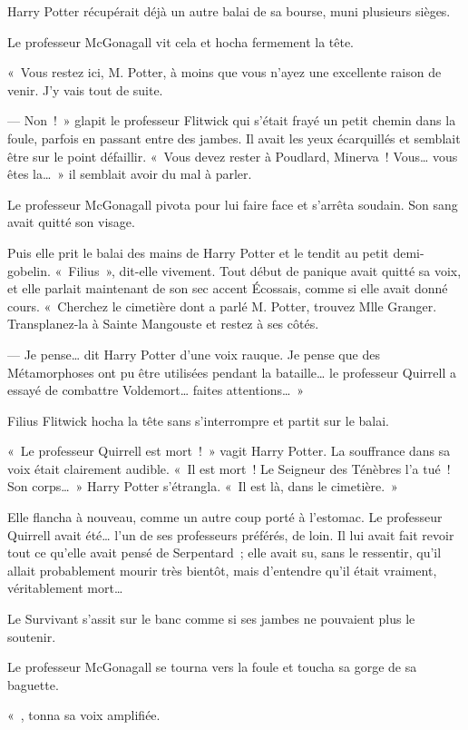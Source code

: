 Harry Potter récupérait déjà un autre balai de sa bourse, muni plusieurs sièges.

Le professeur McGonagall vit cela et hocha fermement la tête.

«~Vous restez ici, M. Potter, à moins que vous n'ayez une excellente raison de venir. J'y vais tout de suite.

--- Non~!~» glapit le professeur Flitwick qui s'était frayé un petit chemin dans la foule, parfois en passant entre des jambes. Il avait les yeux écarquillés et semblait être sur le point défaillir. «~Vous devez rester à Poudlard, Minerva~! Vous… vous êtes la…~» il semblait avoir du mal à parler.

Le professeur McGonagall pivota pour lui faire face et s'arrêta soudain. Son sang avait quitté son visage.

Puis elle prit le balai des mains de Harry Potter et le tendit au petit demi-gobelin. «~Filius~», dit-elle vivement. Tout début de panique avait quitté sa voix, et elle parlait maintenant de son sec accent Écossais, comme si elle avait donné cours. «~Cherchez le cimetière dont a parlé M. Potter, trouvez Mlle Granger. Transplanez-la à Sainte Mangouste et restez à ses côtés.

--- Je pense… dit Harry Potter d'une voix rauque. Je pense que des Métamorphoses ont pu être utilisées pendant la bataille… le professeur Quirrell a essayé de combattre Voldemort… faites attentions…~»

Filius Flitwick hocha la tête sans s'interrompre et partit sur le balai.

«~Le professeur Quirrell est mort~!~» vagit Harry Potter. La souffrance dans sa voix était clairement audible. «~Il est mort~! Le Seigneur des Ténèbres l'a tué~! Son corps…~» Harry Potter s'étrangla. «~Il est là, dans le cimetière.~»

Elle flancha à nouveau, comme un autre coup porté à l'estomac. Le professeur Quirrell avait été… l'un de ses professeurs préférés, de loin. Il lui avait fait revoir tout ce qu'elle avait pensé de Serpentard~; elle avait su, sans le ressentir, qu'il allait probablement mourir très bientôt, mais d'entendre qu'il était vraiment, véritablement mort…

Le Survivant s'assit sur le banc comme si ses jambes ne pouvaient plus le soutenir.

Le professeur McGonagall se tourna vers la foule et toucha sa gorge de sa baguette.

«~, tonna sa voix amplifiée. 

